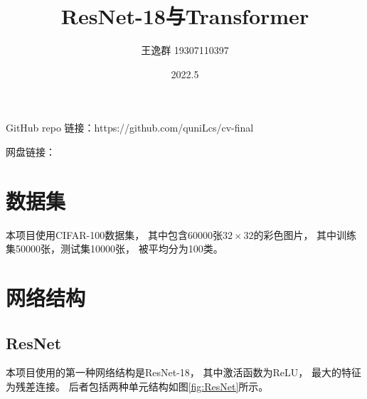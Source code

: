 \documentclass[12pt]{article}
\title{ResNet-18与Transformer}
\author{王逸群 19307110397}
\date{2022.5}
\begin{document}
	
\maketitle

GitHub repo 链接：https://github.com/quniLcs/cv-final

网盘链接：

\section{数据集}

本项目使用CIFAR-100数据集，
其中包含60000张$32\times32$的彩色图片，
其中训练集50000张，测试集10000张，
被平均分为100类。

\section{网络结构}

\subsection{ResNet}

本项目使用的第一种网络结构是ResNet-18，
其中激活函数为ReLU，
最大的特征为残差连接。
后者包括两种单元结构如图\ref{fig:ResNet}所示。
\end{document}
